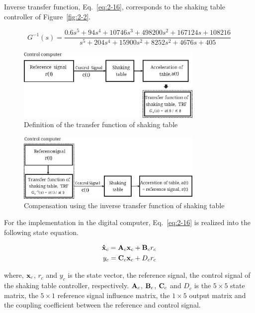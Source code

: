 Inverse transfer function, Eq.~\eqref{eq:2-16}, corresponds to the shaking table controller of Figure~\ref{fig:2-2}. 

\begin{equation}\label{eq:2-16}
G^{-1}(s) = \frac{0.6s^5 + 94s^4 + 10746s^3 + 498200s^2 + 167124s + 108216}{s^5 + 204s^4 + 15900s^2 + 8252s^2 + 4676s + 405}
\end{equation}

\begin{figure}[ht]
\centering
\includegraphics[width=0.8\textwidth] {figure/5-13.eps}
\caption{Definition of the transfer function of shaking table}
\label{fig:5-13}
\end{figure}

\begin{figure}[ht]
\centering
\includegraphics[width=0.8\textwidth] {figure/5-14.eps}
\caption{Compensation using the inverse transfer function of shaking table}
\label{fig:5-14}
\end{figure}

For the implementation in the digital computer, Eq.~\eqref{eq:2-16} is realized into the following state equation.

\begin{equation}\label{eq:2-17}
\begin{aligned}
\mathbf{\dot{x}}_{c} = \mathbf{A}_{c}\mathbf{x}_{c} + \mathbf{B}_{c}r_{c}\\
y_{c}=\mathbf{C}_{c}\mathbf{x}_{c}+D_{c}r_{c}
\end{aligned}
\end{equation}

where, $\mathbf{x}_{c}$, $r_{c}$ and $y_{c}$ is the state vector, the reference signal, the control signal of the shaking table controller, respectively. $\mathbf{A}_{c}$, $\mathbf{B}_{c}$, $\mathbf{C}_{c}$ and $D_{c}$ is the $5\times5$ state matrix, the $5\times1$ reference signal influence matrix, the $1\times5$ output matrix and the coupling coefficient between the reference and control signal.

